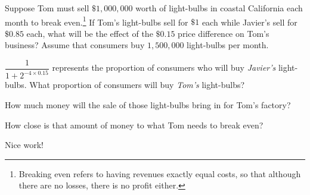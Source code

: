 \documentclass{ximera}
\begin{document}
\begin{question}
Suppose Tom must sell $\$1,000,000$ worth of light-bulbs in coastal California each month to break even.\footnote{Breaking even refers to having revenues exactly equal costs, so that although there are no losses, there is no profit either.} If Tom's light-bulbs sell for $\$1$ each while Javier's sell for $\$0.85$ each, what will be the effect of the $\$0.15$ price difference on Tom's business? Assume that consumers buy $1,500,000$ light-bulbs per month. 


\begin{multipleChoice}
    \end{multipleChoice}
\begin{hint}
$\dfrac{1}{1+2^{-4\times 0.15}}$ represents the proportion of consumers who will buy \emph{Javier's} light-bulbs. What proportion of consumers will buy \emph{Tom's} light-bulbs?
\end{hint}
\begin{hint}
How much money will the sale of those light-bulbs bring in for Tom's factory?
\end{hint}
\begin{hint}
How close is that amount of money to what Tom needs to break even?
\end{hint}

Nice work!
\end{question}
\end{document}
